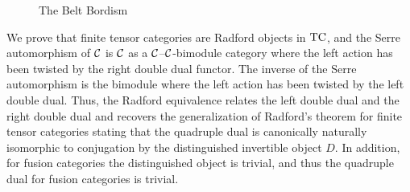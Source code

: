 \documentclass{amsart}
\begin{document}
\begin{figure}[htbp]
\begin{center}
		\end{center}	
	\caption{The Belt Bordism}
	\label{fig:belt_bordism}
\end{figure}




We prove that finite tensor categories are Radford objects in $\mathrm{TC}$, and the Serre automorphism of $\mathcal C$ is $\mathcal C$ as a $\mathcal C$--$\mathcal C$-bimodule category where the left action has been twisted by the right double dual functor.  The inverse of the Serre automorphism is the bimodule where the left action has been twisted by the left double dual.  Thus, the Radford equivalence relates the left double dual and the right double dual and recovers the generalization of Radford's theorem for finite tensor categories \cite{MR0407069, MR2097289} stating that the quadruple dual is canonically naturally isomorphic to conjugation by the distinguished invertible object $D$.  In addition, for fusion categories the distinguished object is trivial, and thus the quadruple dual for fusion categories is trivial.  
\end{document}
